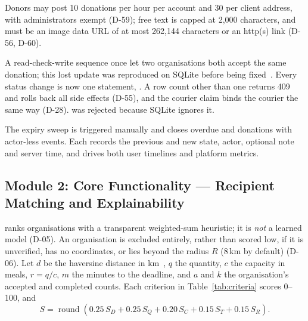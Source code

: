 Donors may post 10 donations per hour per account and 30 per client address,
with administrators exempt (D-59); free text is capped at 2{,}000 characters, and
 must be an image data URL of at most 262{,}144 characters or an
http(s) link (D-56, D-60).

A read-check-write sequence once let two organisations both accept the same
donation; this lost update was reproduced on SQLite before being
fixed~\cite{kleppmann2017}. Every status change is now one statement,
. A row
count other than one returns 409 and rolls back all side effects (D-55), and the
courier claim binds the courier the same way (D-28).
 was rejected because SQLite ignores it.

The expiry sweep is triggered manually and closes overdue  and
 donations with actor-less events. Each  records
the previous and new state, actor, optional note and server time, and drives both
user timelines and platform metrics.

\subsection{Module 2: Core Functionality --- Recipient Matching and Explainability}
\label{sec:module-matching}

 ranks organisations with a transparent weighted-sum
heuristic; it is \emph{not} a learned model (D-05). An organisation is
excluded entirely, rather than scored low, if it is
unverified, has no coordinates, or lies beyond the radius $R$ (8\,km by default)
(D-06). Let $d$ be the haversine distance in km~\cite{sinnott1984haversine}, $q$
the quantity, $c$ the capacity in meals, $r=q/c$, $m$ the minutes to the
deadline, and $a$ and $k$ the organisation's accepted and completed counts. Each
criterion in Table~\ref{tab:criteria} scores 0--100, and
\begin{equation}
  S = \operatorname{round}\left(0.25\,S_D + 0.25\,S_Q + 0.20\,S_C + 0.15\,S_T + 0.15\,S_R\right).
  \label{eq:overall}
\end{equation}

